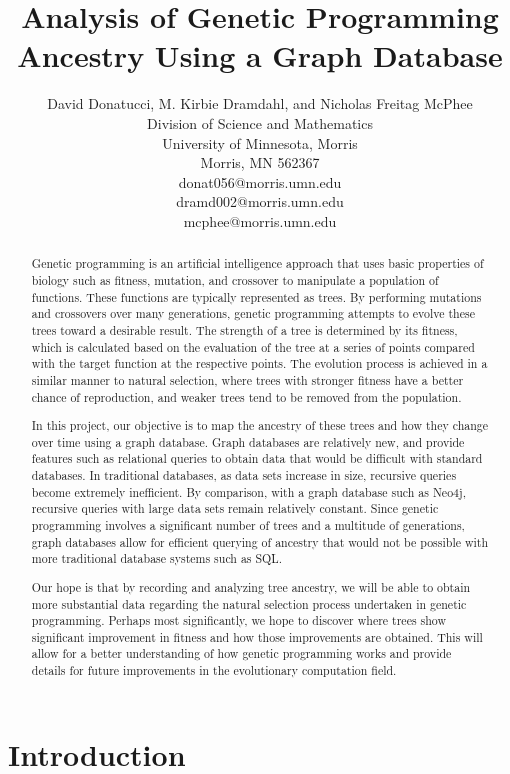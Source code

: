 \documentclass[12pt]{article}
\title{Analysis of Genetic Programming Ancestry Using a Graph Database}
\author{
 		David Donatucci, M. Kirbie Dramdahl, and Nicholas Freitag McPhee\\
        Division of Science and Mathematics\\
        University of Minnesota, Morris\\
        Morris, MN 562367\\
        donat056@morris.umn.edu\\
        dramd002@morris.umn.edu\\
        mcphee@morris.umn.edu\\
}
\date{}
\begin{document}
\pagestyle{plain}

\maketitle

\begin{abstract}

Genetic programming is an artificial intelligence approach that uses basic properties of biology such as fitness, mutation, and crossover to manipulate a population of functions. These functions are typically represented as trees. By performing mutations and crossovers over many generations, genetic programming attempts to evolve these trees toward a desirable result. The strength of a tree is determined by its fitness, which is calculated based on the evaluation of the tree at a series of points compared with the target function at the respective points. The evolution process is achieved in a similar manner to natural selection, where trees with stronger fitness have a better chance of reproduction, and weaker trees tend to be removed from the population.

In this project, our objective is to map the ancestry of these trees and how they change over time using a graph database. Graph databases are relatively new, and provide features such as relational queries to obtain data that would be difficult with standard databases. In traditional databases, as data sets increase in size, recursive queries become extremely inefficient. By comparison, with a graph database such as Neo4j, recursive queries with large data sets remain relatively constant. Since genetic programming involves a significant number of trees and a multitude of generations, graph databases allow for efficient querying of ancestry that would not be possible with more traditional database systems such as SQL.  

Our hope is that by recording and analyzing tree ancestry, we will be able to obtain more substantial data regarding the natural selection process undertaken in genetic programming. Perhaps most significantly, we hope to discover where trees show significant improvement in fitness and how those improvements are obtained. This will allow for a better understanding of how genetic programming works and provide details for future improvements in the evolutionary computation field.

\end{abstract}

\section{Introduction} \label{sec:intro}
\end{document}
